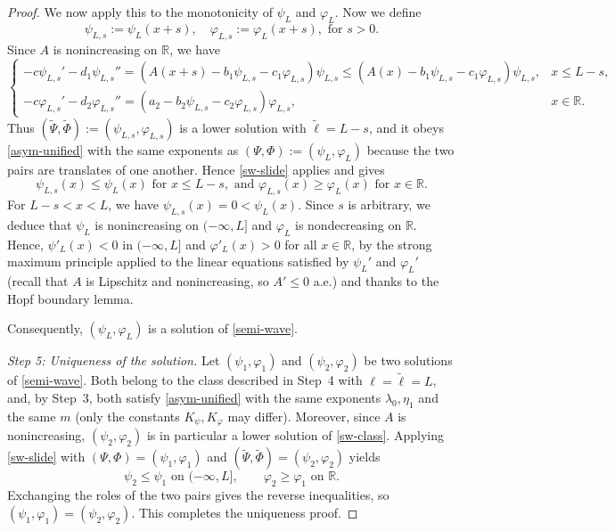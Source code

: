 \documentclass[reqno]{amsart}
\newcommand{\rev}[1]{#1}
\theoremstyle{plain}
\theoremstyle{definition}
\theoremstyle{remark}
\begin{document}
\begin{proof}
		\rev{We now apply this to the monotonicity of $\psi_L$ and $\varphi_L$.}
		Now we define
		\[
		\psi_{L,s} := \psi_L(x + s), \quad \varphi_{L,s} := \varphi_L(x + s), \text{ for } s > 0.
		\]
		Since \(A\) is nonincreasing on \(\mathbb{R}\), we have
		\[
		\begin{cases}
			-c \psi_{L,s} ' - d_1 \psi_{L,s} '' = (A(x + s) - b_1 \psi_{L,s} - c_1 \varphi_{L,s})  \psi_{L,s} \le (A(x) - b_1 \psi_{L,s}  - c_1 \varphi_{L,s})\psi_{L,s}, & x \le L-s,\\
			-c \varphi_{L,s} ' - d_2 \varphi_{L,s} '' = (a_2 - b_2 \psi_{L,s} - c_2 \varphi_{L,s})  \varphi_{L,s}, & x \in \mathbb{R}.
		\end{cases}
		\]
		\rev{Thus $(\tilde\Psi,\tilde\Phi):=(\psi_{L,s},\varphi_{L,s})$ is a lower
		solution with $\tilde\ell=L-s$, and it obeys \eqref{asym-unified} with the
		same exponents as $(\Psi,\Phi):=(\psi_L,\varphi_L)$ because the two pairs are
		translates of one another. Hence \eqref{sw-slide} applies and gives}
		\[
		\psi_{L,s}(x) \le \psi_L(x) \text{ for } x \le L -s, \text{ and }  \varphi_{L,s}(x) \ge \varphi_L(x) \text{ for } x \in \mathbb{R}.
		\]
		For \(L -s < x < L\), we have \(\psi_{L,s}(x) = 0 < \psi_L(x)\). Since $s$ is arbitrary, we deduce that $\psi_L$ is \rev{nonincreasing} on $(-\infty,L]$ and $\varphi_L$ is \rev{nondecreasing} on $\mathbb{R}$.
		Hence, $\psi'_L(x) < 0$ in $(-\infty, L]$ and $\varphi'_L(x) > 0$ for all $x \in \mathbb{R}$, \rev{by the strong maximum principle applied to the linear equations satisfied by $\psi_L'$ and $\varphi_L'$ (recall that $A$ is Lipschitz and nonincreasing, so $A'\le0$ a.e.) and} thanks to the Hopf boundary lemma.

		Consequently, $(\psi_L, \varphi_L)$ is a solution of \eqref{semi-wave}.
		


		\rev{\textit{Step 5: Uniqueness of the solution.}}
		Let $(\psi_1,\varphi_1)$ and $(\psi_2,\varphi_2)$ be two solutions of \eqref{semi-wave}.
		\rev{Both belong to the class described in Step~4 with $\ell=\tilde\ell=L$,
		and, by Step~3, both satisfy \eqref{asym-unified} with the same exponents
		$\lambda_0,\eta_1$ and the same $m$ (only the constants $K_\psi,K_\varphi$
		may differ). Moreover, since $A$ is nonincreasing, $(\psi_2,\varphi_2)$ is
		in particular a lower solution of \eqref{sw-class}. Applying
		\eqref{sw-slide} with $(\Psi,\Phi)=(\psi_1,\varphi_1)$ and
		$(\tilde\Psi,\tilde\Phi)=(\psi_2,\varphi_2)$ yields
		\[
		\psi_2\le\psi_1 \text{ on }(-\infty,L],\qquad \varphi_2\ge\varphi_1 \text{ on }\mathbb{R}.
		\]
		Exchanging the roles of the two pairs gives the reverse inequalities, so
		$(\psi_1,\varphi_1)=(\psi_2,\varphi_2)$. This completes the uniqueness proof.}


\end{proof}
\end{document}

